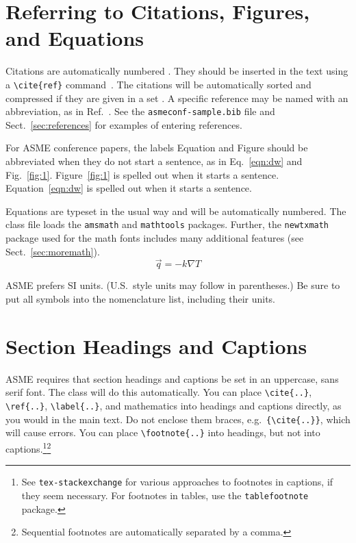 \documentclass[grid,balance,upint,subscriptcorrection,varvw,mathalfa=cal=euler,spanish,french,greek,russian,vietnamese,colorlinks]{asmeconf}
\begin{document}


\section{Referring to Citations, Figures, and Equations}

Citations are automatically numbered \cite{ning2002}. They should be inserted in the text using a \verb|\cite{ref}| command~\cite{gibson2008,stevens1999}. The citations will be automatically sorted and compressed if they are given in a set \cite{stevens1999,ning2002,gibson2008,wions2005,smith2002,watson1982}. 
A specific reference may be named with an abbreviation, as in Ref.~\cite{watson1982}.
See the \texttt{asmeconf-sample.bib} file and Sect.~\ref{sec:references} for examples of entering references.

For ASME conference papers, the labels Equation and Figure should be abbreviated when they do not start a sentence, as in  Eq.~\eqref{eqn:dw} and Fig.~\ref{fig:1}. Figure~\ref{fig:1} is spelled out when it starts a sentence. Equation~\eqref{eqn:dw} is spelled out when it starts a sentence. 

Equations are typeset in the usual way and will be automatically numbered.  The class file loads the \texttt{amsmath} and \texttt{mathtools} packages. Further, the \texttt{newtxmath} package used for the math fonts includes many additional features (see Sect.~\ref{sec:moremath}).
\begin{equation}\label{eqn:fourier}
\vec{q} = -k\nabla T
\end{equation}

ASME prefers SI units. (U.S.\ style units may follow in parentheses.) Be sure to put all symbols into the nomenclature list, including their units.




\section{Section Headings and Captions}

ASME requires that section headings and captions be set in an uppercase, sans serif font.  The class will do this automatically.  You can place \verb|\cite{..}|, \verb|\ref{..}|, \verb|\label{..}|, and mathematics into headings and captions directly, as you would in the main text. Do not enclose them braces, e.g.\ \verb|{\cite{..}}|, which will cause errors. You can place \verb|\footnote{..}| into headings, but not into captions.\footnote{See \texttt{tex-stackexchange} for various approaches to footnotes in captions, if they seem necessary. For footnotes in tables, use the \texttt{tablefootnote} package.}\footnote{Sequential footnotes are automatically separated by a comma.}
\end{document}
